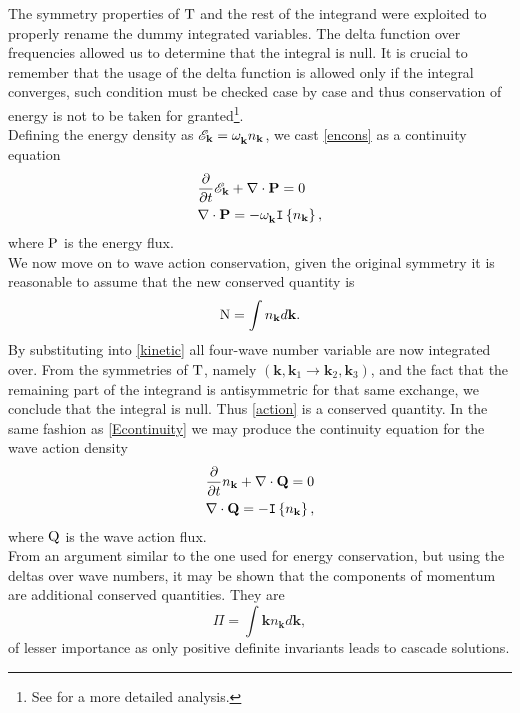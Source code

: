 The symmetry properties of $\mathrm{T}$ and the rest of the integrand were exploited to properly rename the dummy integrated variables. The delta function over frequencies 
allowed us to determine that the integral is null. It is crucial to remember that the usage of the delta function is allowed only if the integral converges, such condition
must be checked case by case and thus conservation of energy is not to be taken for granted\footnote{See \cite{Zakharov} for a more detailed analysis.}. \\
Defining the energy density as $\mathscr{E}_\mathbf{k} = \omega^{}_{\mathbf{k}} n_\mathbf{k}$, we cast \eqref{encons} as a continuity equation
\begin{align}
    &\frac{\partial}{\partial t} \mathscr{E}_\mathbf{k} + \nabla\cdot\mathrm{\mathbf{P}} = 0 \label{Econtinuity}\\
    &\nabla\cdot\mathrm{\mathbf{P}} = -\omega^{}_{\mathbf{k}} \mathtt{I}\left\{n_\mathbf{k}\right\}, 
\end{align}
where $\mathrm{P}$ is the energy flux. \\

We now move on to wave action conservation, given the original symmetry it is reasonable to assume that the new conserved quantity is 
\begin{equation}
    \mathrm{N} = \int n_\mathbf{k} d\mathbf{k}.
    \label{action}
\end{equation}
By substituting into \eqref{kinetic}  all four-wave number variable are now integrated over. From the symmetries of  $\mathrm{T}$, 
namely $(\mathbf{k},\mathbf{k}_1 \rightarrow \mathbf{k}_2,\mathbf{k}_3)$, and the fact that the remaining part of the integrand is antisymmetric for that same exchange, we conclude that the integral 
is null. Thus \eqref{action} is a conserved quantity. In the same fashion as \eqref{Econtinuity} we may produce the continuity equation for the wave action density
\begin{align}
    &\frac{\partial}{\partial t} n_\mathbf{k} + \nabla\cdot\mathrm{\mathbf{Q}} = 0 \label{Ncontinuity}\\
    &\nabla\cdot\mathrm{\mathbf{Q}} = -\mathtt{I}\left\{n_\mathbf{k}\right\}, 
\end{align}
where $\mathrm{Q}$ is the wave action flux. \\
From an argument similar to the one used for energy conservation, but using the deltas over wave numbers, it may be shown that the components of momentum are additional conserved quantities. They are 
\begin{equation}
    \Pi = \int \mathbf{k} n_\mathbf{k} d\mathbf{k},
\end{equation}
of lesser importance as only positive definite invariants leads to cascade solutions. \\

